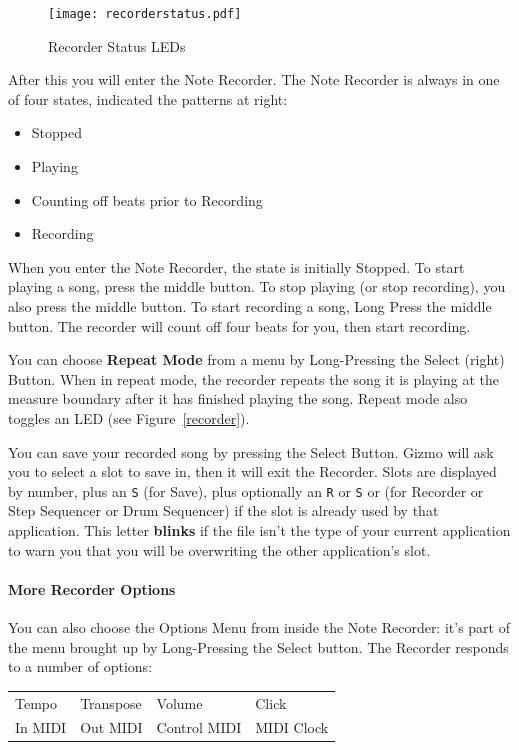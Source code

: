 \documentclass{article}
\begin{document}
\begin{figure}
\texttt{[image: recorderstatus.pdf]}
\vspace{-2em}\caption{\small Recorder Status LEDs}\vspace{-4em}
\label{recorderstatus}
\end{figure}

After this you will enter the Note Recorder.  The Note Recorder is always in one of four states, indicated the patterns at right:

\begin{itemize}
\item Stopped
\item Playing
\item Counting off beats prior to Recording
\item Recording
\end{itemize}

When you enter the Note Recorder, the state is initially Stopped.  To start playing a song, press the middle button.  To stop playing (or stop recording), you also press the middle button.  To start recording a song, Long Press the middle button.  The recorder will count off four beats for you, then start recording.

You can choose {\bf Repeat Mode} from a menu by Long-Pressing the Select (right) Button.  When in repeat mode, the recorder repeats the song it is playing at the measure boundary after it has finished playing the song.  Repeat mode also toggles an LED (see Figure~\ref{recorder}).

You can save your recorded song by pressing the Select Button.  Gizmo will ask you to select a slot to save in, then it will exit the Recorder.  Slots are displayed by number, plus an \texttt{S} (for Save), plus optionally an \texttt{R} or \texttt{S} or  (for Recorder or Step Sequencer or Drum Sequencer) if the slot is already used by that application.  This letter {\bf blinks} if the file isn't the type of your current application to warn you that you will be overwriting the other application's slot.

\paragraph{More Recorder Options}  
You can also choose the Options Menu from inside the Note Recorder: it's part of the menu brought up by Long-Pressing the Select button.  The Recorder responds to a number of options:

\vspace{1em}
\begin{tabular}{llll}
Tempo&Transpose&Volume&Click\\
In MIDI& Out MIDI&Control MIDI&MIDI Clock\\
\end{tabular}
\end{document}
